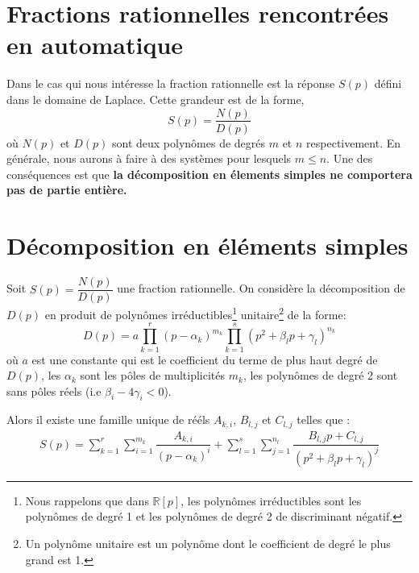 \section{Fractions rationnelles rencontrées en automatique}
Dans le cas qui nous intéresse la fraction rationnelle est la 
réponse $S(p)$ défini dans le domaine de Laplace.
Cette grandeur est de la forme,
$$
S(p)=\dfrac{N(p)}{D(p)}
$$
où $N(p)$ et $D(p)$ sont deux polynômes de degrés $m$ et $n$ respectivement.
En générale, nous aurons à faire à des systèmes pour lesquels $m\le n$. 
Une des conséquences est que \textbf{la décomposition en élements 
simples ne comportera pas de partie entière.}

\section{Décomposition en éléments simples}
Soit $S(p)=\dfrac{N(p)}{D(p)}$ une fraction rationnelle. On considère la 
décomposition de $D(p)$ en produit de polynômes irréductibles\footnote{Nous 
rappelons que dans $\mathbb{R}[p]$, les polynômes irréductibles sont 
les polynômes de degré 1 et les polynômes de degré 2 de discriminant négatif.}
unitaire\footnote{Un polynôme unitaire est un polynôme dont le coefficient 
de degré le plus grand est 1.} de la forme:
$$
D(p)=a\prod_{k=1}^r(p-\alpha_k)^{m_k}\prod_{k=1}^s(p^2+\beta_lp+\gamma_l)^{n_k}
$$
où $a$ est une constante qui est le coefficient du terme de plus haut degré 
de $D(p)$, les $\alpha_k$ sont les pôles de multiplicités $m_k$, les polynômes
de degré 2 sont sans pôles réels (i.e $\beta_i-4\gamma_i<0$).

Alors il existe une famille unique de rééls $A_{k,i}$, $B_{l,j}$ et 
$C_{l,j}$ telles que :
\begin{align}
S(p)=\sum_{k=1}^r\sum_{i=1}^{m_k} \dfrac{A_{k,i}}{\left(p-\alpha_k\right)^i}+
     \sum_{l=1}^s\sum_{j=1}^{n_l} \dfrac{B_{l,j}p+C_{l,j}}{\left(p^2+\beta_lp+
     \gamma_l\right)^j}
\end{align}

